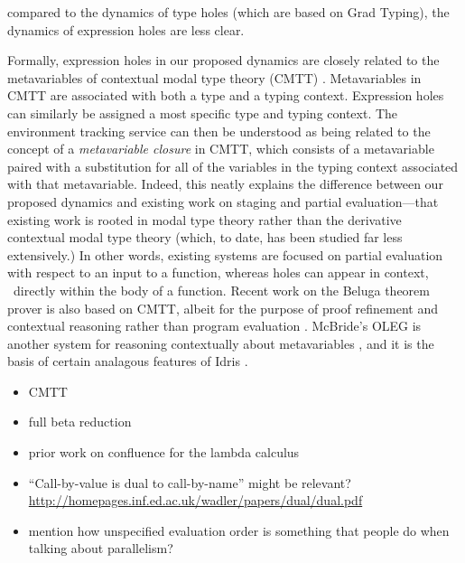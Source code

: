 
compared to the dynamics of type holes (which are based on Grad Typing), the
dynamics of expression holes are less clear.

Formally, expression holes in our proposed dynamics are closely related to the
metavariables of contextual modal type theory (CMTT) \cite{Nanevski2008}.
Metavariables in CMTT are associated with both a type and a typing context.
Expression holes can similarly be assigned a most specific type and typing
context. The environment tracking service can then be understood as being
related to the concept of a \emph{metavariable closure} in CMTT, which consists
of a metavariable paired with a substitution for all of the variables in the
typing context associated with that metavariable. Indeed, this neatly explains
the difference between our proposed dynamics and existing work on staging and
partial evaluation---that existing work is rooted in modal type theory
\cite{Davies:2001op} rather than the derivative contextual modal type theory
(which, to date, has been studied far less extensively.) In other words,
existing systems are focused on partial evaluation with respect to an input to a
function, whereas holes can appear in context, \eg{}~directly within the body of
a function. Recent work on the Beluga theorem prover is also based on CMTT,
albeit for the purpose of proof refinement and contextual reasoning rather than
program evaluation \cite{DBLP:conf/flops/Pientka10,pientka2015inductive}.
McBride's OLEG is another system for reasoning contextually about metavariables
\cite{DBLP:phd/ethos/McBride00}, and it is the basis of certain analagous
features of Idris \cite{brady2013idris}.

\begin{itemize}
	\item CMTT
\end{itemize}


\begin{itemize}
	\item full beta reduction
	\item prior work on confluence for the lambda calculus
	\item ``Call-by-value is dual to call-by-name'' might be relevant? \url{http://homepages.inf.ed.ac.uk/wadler/papers/dual/dual.pdf}
	\item mention how unspecified evaluation order is something that people do when talking about parallelism?
\end{itemize}

